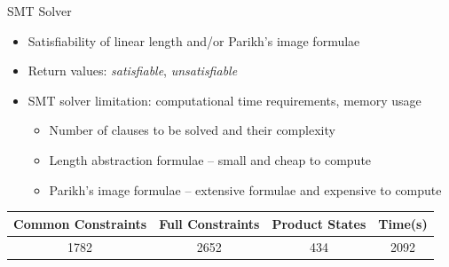 \begin{frame}{SMT Solver}
    \begin{itemize}
        \item Satisfiability of linear length and/or Parikh's image formulae
        \item Return values: \emph{satisfiable}, \emph{unsatisfiable}
        \item SMT solver limitation: computational time requirements, memory usage
        \begin{itemize}
            \item Number of clauses to be solved and their complexity
            \item Length abstraction formulae -- small and cheap to compute
            \item Parikh's image formulae -- extensive formulae and expensive to compute

        \end{itemize}
    \end{itemize}
                \begin{center}
            \begin{tabular}{ |c|c|c|c| } 
                \hline
                Common Constraints & Full Constraints & Product States & Time(s) \\ \hline 
                1782 & 2652 & 434 & 2092 \\ \hline 
            \end{tabular}
            \end{center}
\end{frame}


